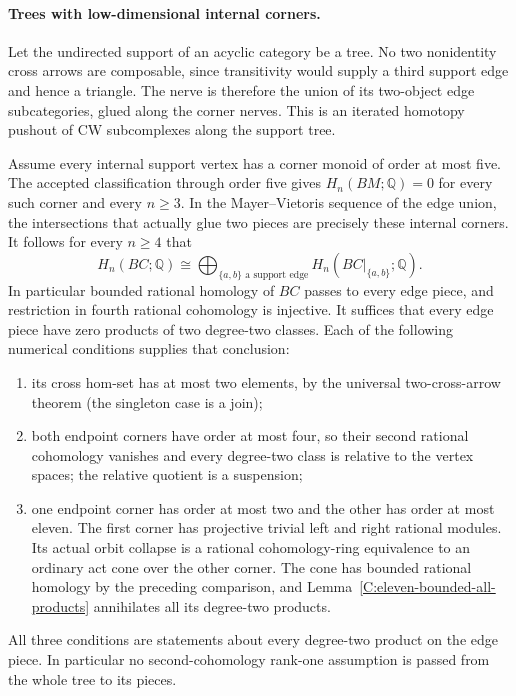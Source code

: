 \paragraph{Trees with low-dimensional internal corners.}
Let the undirected support of an acyclic category be a tree.
No two nonidentity cross arrows are composable, since transitivity
would supply a third support edge and hence a triangle.  The nerve
is therefore the union of its two-object edge subcategories, glued
along the corner nerves.  This is an iterated homotopy pushout of
CW subcomplexes along the support tree.

Assume every internal support vertex has a corner monoid of order
at most five.  The accepted classification through order five
gives $H_n(BM;\mathbb Q)=0$ for every such corner and every $n\geq3$.
In the Mayer--Vietoris sequence of the edge union, the intersections
that actually glue two pieces are precisely these internal corners.
It follows for every $n\geq4$ that
\[
 H_n(BC;\mathbb Q)\cong
 \bigoplus_{\{a,b\}\text{ a support edge}}
 H_n(BC|_{\{a,b\}};\mathbb Q).
\]
In particular bounded rational homology of $BC$ passes to every
edge piece, and restriction in fourth rational cohomology is
injective.  It suffices that every edge piece have zero products
of two degree-two classes.  Each of the following numerical
conditions supplies that conclusion:
\begin{enumerate}
\item its cross hom-set has at most two elements, by the universal
two-cross-arrow theorem (the singleton case is a join);
\item both endpoint corners have order at most four, so their
second rational cohomology vanishes and every degree-two class
is relative to the vertex spaces; the relative quotient is a
suspension;
\item one endpoint corner has order at most two and the other has
order at most eleven.  The first corner has projective trivial
left and right rational modules.  Its actual orbit collapse is a
rational cohomology-ring equivalence to an ordinary act cone over
the other corner.  The cone has bounded rational homology by the
preceding comparison, and Lemma~\ref{C:eleven-bounded-all-products}
annihilates all its degree-two products.
\end{enumerate}
All three conditions are statements about every degree-two product
on the edge piece.  In particular no second-cohomology rank-one
assumption is passed from the whole tree to its pieces.
